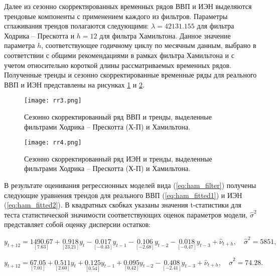 \documentclass[a4paper,14pt]{extreport}
\begin{document}
	Далее из сезонно скорректированных временных рядов ВВП и ИЭН выделяются трендовые компоненты с применением каждого из фильтров. Параметры сглаживания трендов полагаются следующими: $\lambda=42131.155$ для фильтра Ходрика -- Прескотта \cite{esiMakingAlt} и $h=12$ для фильтра Хамильтона. Данное значение параметра $h$, соответствующее годичному циклу по месячным данным, выбрано в соответствии с общими рекомендациями в рамках фильтра Хамильтона и с учетом относительно короткой длины рассматриваемых временных рядов. Полученные тренды и сезонно скорректированные временные ряды для реального ВВП и ИЭН представлены на рисунках \ref{fig:rr3} и \ref{fig:rr4}.
	
	\begin{figure}
		\texttt{[image: rr3.png]}
		\caption{
			Сезонно скорректированный ряд ВВП и тренды, 
			выделенные фильтрами Ходрика -- Прескотта (Х-П) и Хамильтона. 
		}
		\label{fig:rr3}
	\end{figure}	

	\begin{figure}
		\texttt{[image: rr4.png]}
		\caption{
			Сезонно скорректированный ряд ИЭН и тренды, 
			выделенные фильтрами Ходрика -- Прескотта (Х-П) и Хамильтона.
		}
		\label{fig:rr4}
	\end{figure}	

	В результате оценивания регрессионных моделей вида (\ref{eq:ham_filter}) получены следующие уравнения трендов для реального ВВП (\ref{eq:ham_fitted1}) и ИЭН (\ref{eq:ham_fitted2}). В квадратных скобках указаны значения t-статистики для теста статистической значимости соответствующих оценок параметров модели, $\hat{\sigma}^2$ представляет собой оценку дисперсии остатков:

	
	\begin{equation}
		y_{t+12} = \underset{[7.63]}{1490.67} 
		+ \underset{[23.21]}{0.918} y_{t}
		- \underset{[-0.43]}{0.017} y_{t-1}
		- \underset{[-2.68]}{0.106} y_{t-2}
		- \underset{[-0.47]}{0.018} y_{t-3}
		+ \hat{\nu}_{t+h}, \quad \hat{\sigma}^2=5851 ,
		\label{eq:ham_fitted1}
	\end{equation}
	
	\begin{equation}
		y_{t+12} = \underset{[7.01]}{67.05} 
		+ \underset{[2.60]}{0.511} y_{t}
		+ \underset{[0.54]}{0.125} y_{t-1}
		+ \underset{[0.42]}{0.095} y_{t-2}
		- \underset{[-2.41]}{0.408} y_{t-3}
		+ \hat{\nu}_{t+h}, \quad \hat{\sigma}^2=74.28 .
		\label{eq:ham_fitted2}
	\end{equation}
	
\end{document}
